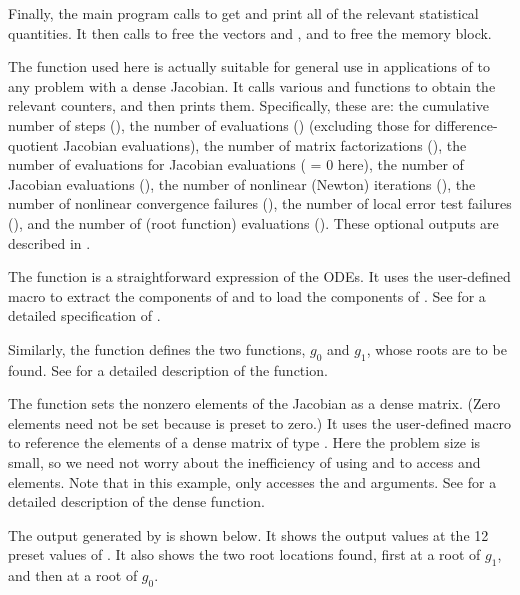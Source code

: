 Finally, the main program calls  to get and print
all of the relevant statistical quantities.  It then calls 
to free the vectors  and , and  to free the 
{\cvode} memory block.

The function  used here is actually suitable for
general use in applications of {\cvode} to any problem with a dense 
Jacobian.  It calls various  and 
functions to obtain the relevant counters, and then prints them.
Specifically, these are: the cumulative number of steps (), 
the number of  evaluations () (excluding those for
difference-quotient Jacobian evaluations),
the number of matrix factorizations (),
the number of  evaluations for Jacobian evaluations (
= 0 here),
the number of Jacobian evaluations (),
the number of nonlinear (Newton) iterations (),
the number of nonlinear convergence failures (),
the number of local error test failures (), and
the number of  (root function) evaluations ().
These optional outputs are described in .

The function  is a straightforward expression of the ODEs. 
It uses the user-defined macro  to extract the components of 
and to load the components of .
See  for a detailed specification of .

Similarly, the function  defines the two functions, $g_0$ and $g_1$,
whose roots are to be found.  See  for a detailed description
of the  function.

The function  sets the nonzero elements of the Jacobian as a
dense matrix.  (Zero elements need not be set because  is preset
to zero.)  It uses the user-defined macro  to reference the
elements of a dense matrix of type .  Here the problem
size is small, so we need not worry about the inefficiency of using
 and  to access  and
 elements.  Note that in this example, 
only accesses the  and  arguments.  See 
for a detailed description of the dense  function.

The output generated by  is shown below.  It shows the output
values at the 12 preset values of .  It also shows the two root
locations found, first at a root of $g_1$, and then at a root of $g_0$.

